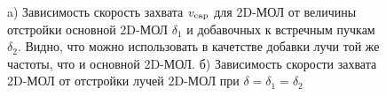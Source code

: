 	

\begin{figure}[ht]
    \centering
    \hspace{20 mm} 
    \vspace{-3mm}
    \caption{a) Зависимость скорость захвата $v_{\textnormal{cap}}$ для 2D-МОЛ от величины отстройки основной 2D-МОЛ $\delta_1$ и добавочных к встречным пучкам $\delta_2$. Видно, что можно использовать в качетстве добавки лучи той же частоты, что и основной 2D-МОЛ. б) Зависимость скорости захвата 2D-МОЛ от отстройки лучей 2D-МОЛ при $\delta=\delta_1=\delta_2$}
    \label{fig:motplus}
\end{figure}

